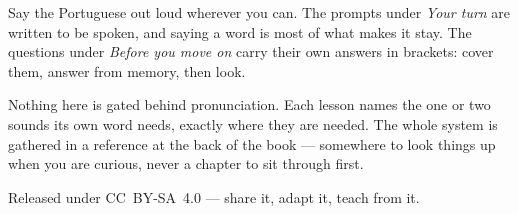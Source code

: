 \documentclass[11pt,twoside]{book}
\begin{document}
Say the Portuguese out loud wherever you can. The prompts under \emph{Your turn}
are written to be spoken, and saying a word is most of what makes it stay. The
questions under \emph{Before you move on} carry their own answers in brackets:
cover them, answer from memory, then look.

Nothing here is gated behind pronunciation. Each lesson names the one or two
sounds its own word needs, exactly where they are needed. The whole system is
gathered in a reference at the back of the book --- somewhere to look things up
when you are curious, never a chapter to sit through first.

Released under CC~BY-SA~4.0 --- share it, adapt it, teach from it.

\tableofcontents

\mainmatter


\end{document}
